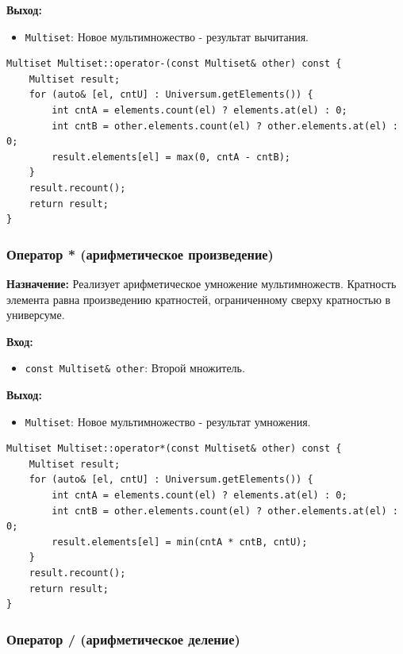 \textbf{Выход:}
\begin{itemize}
    \item \texttt{Multiset}: Новое мультимножество - результат вычитания.
\end{itemize}

\begin{lstlisting}[style=cstyle, caption={Реализация operator-()}]
Multiset Multiset::operator-(const Multiset& other) const {
    Multiset result;
    for (auto& [el, cntU] : Universum.getElements()) {
        int cntA = elements.count(el) ? elements.at(el) : 0;
        int cntB = other.elements.count(el) ? other.elements.at(el) : 0;
        result.elements[el] = max(0, cntA - cntB);
    }
    result.recount();
    return result;
}
\end{lstlisting}

\subsubsection{Оператор * (арифметическое произведение)}

\textbf{Назначение:} Реализует арифметическое умножение мультимножеств. Кратность элемента равна произведению кратностей, ограниченному сверху кратностью в универсуме.

\textbf{Вход:}
\begin{itemize}
    \item \texttt{const Multiset\& other}: Второй множитель.
\end{itemize}

\textbf{Выход:}
\begin{itemize}
    \item \texttt{Multiset}: Новое мультимножество - результат умножения.
\end{itemize}

\begin{lstlisting}[style=cstyle, caption={Реализация operator*()}]
Multiset Multiset::operator*(const Multiset& other) const {
    Multiset result;
    for (auto& [el, cntU] : Universum.getElements()) {
        int cntA = elements.count(el) ? elements.at(el) : 0;
        int cntB = other.elements.count(el) ? other.elements.at(el) : 0;
        result.elements[el] = min(cntA * cntB, cntU);
    }
    result.recount();
    return result;
}
\end{lstlisting}

\subsubsection{Оператор / (арифметическое деление)}

